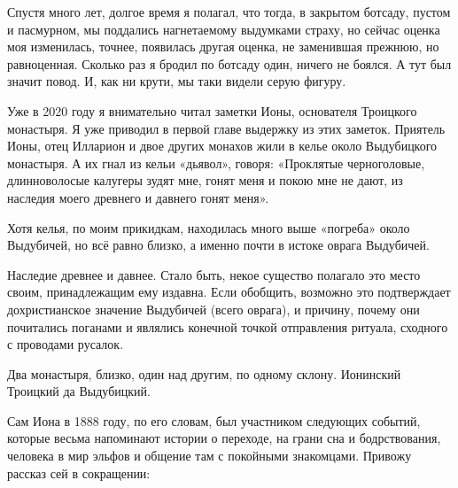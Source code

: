 Спустя много лет, долгое время я полагал, что тогда, в закрытом ботсаду, пустом и пасмурном, мы поддались нагнетаемому выдумками страху, но сейчас оценка моя изменилась, точнее, появилась другая оценка, не заменившая прежнюю, но равноценная. Сколько раз я бродил по ботсаду один, ничего не боялся. А тут был значит повод. И, как ни крути, мы таки видели серую фигуру.

Уже в 2020 году я внимательно читал заметки Ионы, основателя Троицкого монастыря. Я уже приводил в первой главе выдержку из этих заметок. Приятель Ионы, отец Илларион и двое других монахов жили в келье около Выдубицкого монастыря. А их гнал из кельи «дьявол», говоря:  «Проклятые черноголовые, длинноволосые калугеры зудят мне, гонят меня и покою мне не дают, из наследия моего древнего и давнего гонят меня».

Хотя келья, по моим прикидкам, находилась много выше «погреба» около Выдубичей, но всё равно близко, а именно почти в истоке оврага Выдубичей. 

Наследие древнее и давнее. Стало быть, некое существо полагало это место своим, принадлежащим ему издавна. Если обобщить, возможно это подтверждает дохристианское значение Выдубичей (всего оврага), и причину, почему они почитались поганами и являлись конечной точкой отправления ритуала, сходного с проводами русалок.

Два монастыря, близко, один над другим, по одному склону. Ионинский Троицкий да Выдубицкий.

Сам Иона в 1888 году, по его словам, был участником следующих событий, которые весьма напоминают истории о переходе, на грани сна и бодрствования, человека в мир эльфов и общение там с покойными знакомцами. Привожу рассказ сей в сокращении:


